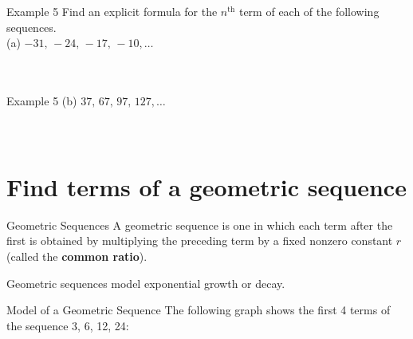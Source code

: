 \documentclass[t,usenames,dvipsnames]{beamer}
\begin{document}
\begin{frame}{Example 5}
Find an explicit formula for the $n^\text{th}$ term of each of the following sequences. \newline\\
(a) \quad $-31, \, -24, \, -17, \, -10, \dots$  \newline\\

    \newline\\
 \newline\\
\end{frame}

\begin{frame}{Example 5}
(b) \quad $37, \, 67, \, 97, \, 127, \dots$ \newline\\

    \newline\\
 \newline\\
\end{frame}

\section{Find terms of a geometric sequence}

\begin{frame}{Geometric Sequences}
A \alert{geometric sequence} is one in which each term after the first is obtained by multiplying the preceding term by a fixed nonzero constant $r$ (called the {\color{blue}\textbf{common ratio}}). \newline\\  \pause

Geometric sequences model exponential growth or decay.  \newline\\
\end{frame}

\begin{frame}{Model of a Geometric Sequence}
The following graph shows the first 4 terms of the sequence 3, 6, 12, 24:  \newline\\
\begin{center}
\end{center}
\end{frame}
\end{document}
